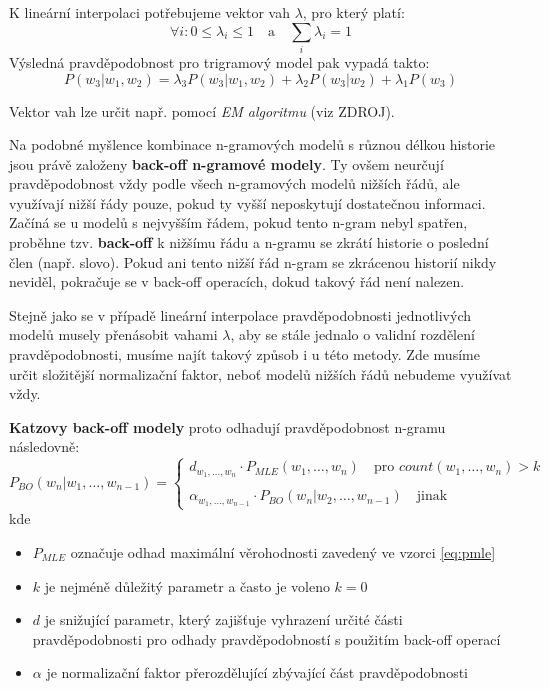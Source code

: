 \documentclass[12pt,a4paper]{report}
\begin{document}
K lineární interpolaci potřebujeme vektor vah $\lambda$, pro který platí:
\begin{equation}
\forall i : 0 \leq \lambda_i \leq 1 \quad \text{a} \quad \sum_{i} \lambda_i = 1
\end{equation}
Výsledná pravděpodobnost pro trigramový model pak vypadá takto:
\begin{equation}
P(w_3|w_1, w_2) = \lambda_3 P(w_3|w_1,w_2) + \lambda_2 P(w_3|w_2) + \lambda_1 P(w_3)
\end{equation}

Vektor vah lze určit např. pomocí \textit{EM algoritmu} (viz ZDROJ).

Na podobné myšlence kombinace n-gramových modelů s různou délkou historie jsou právě založeny \textbf{back-off n-gramové modely}. Ty ovšem neurčují pravděpodobnost vždy podle všech n-gramových modelů nižších řádů, ale využívají nižší řády pouze, pokud ty vyšší neposkytují dostatečnou informaci. Začíná se u modelů s nejvyšším řádem, pokud tento n-gram nebyl spatřen, proběhne tzv. \textbf{back-off} k nižšímu řádu a n-gramu se zkrátí historie o poslední člen (např. slovo). Pokud ani tento nižší řád n-gram se zkrácenou historií nikdy neviděl, pokračuje se v back-off operacích, dokud takový řád není nalezen.

Stejně jako se v případě lineární interpolace pravděpodobnosti jednotlivých modelů musely přenásobit vahami $\lambda$, aby se stále jednalo o validní rozdělení pravděpodobnosti, musíme najít takový způsob i u této metody. Zde musíme určit složitější normalizační faktor, neboť modelů nižších řádů nebudeme využívat vždy.

\textbf{Katzovy back-off modely} proto odhadují pravděpodobnost n-gramu následovně:
\begin{equation}
P_{BO}(w_n|w_1, \ldots, w_{n-1}) = \left\{
\begin{array}{l}
d_{w_1, \ldots, w_n} \cdot P_{MLE}(w_1, \ldots, w_n) \quad \text{pro $count(w_1, \ldots, w_n) > k$} \\
\\
\alpha_{w_1, \ldots, w_{n-1}} \cdot P_{BO}(w_n|w_2, \ldots, w_{n-1}) \quad \text{jinak} 
\end{array}\right.
\end{equation}
kde \begin{itemize}
\item{$P_{MLE}$ označuje odhad maximální věrohodnosti zavedený ve vzorci \eqref{eq:pmle}}
\item{$k$ je nejméně důležitý parametr a často je voleno $k = 0$}
\item{$d$ je snižující parametr, který zajišťuje vyhrazení určité části pravděpodobnosti pro odhady pravděpodobností s použitím back-off operací}
\item{$\alpha$ je normalizační faktor přerozdělující zbývající část pravděpodobnosti}
\end{itemize}
\end{document}
